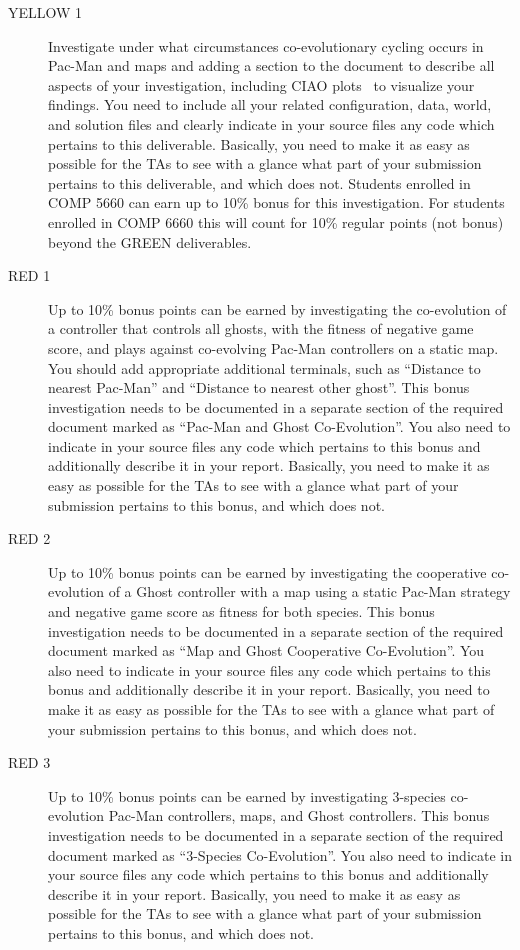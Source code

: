 \documentclass{article}
\begin{document}
\begin{description}
\item[YELLOW 1] Investigate under what circumstances co-evolutionary cycling occurs in Pac-Man and maps and adding a section to the document to describe all aspects of your investigation, including CIAO plots~\cite{Cliff1995} to visualize your findings. You need to include all your related configuration, data, world, and solution files and clearly indicate in your source files any code which pertains to this deliverable. Basically, you need to make it as easy as possible for the TAs to see with a glance what part of your submission pertains to this deliverable, and which does not.
Students enrolled in COMP 5660 can earn up to 10\% bonus for this investigation. For students enrolled in COMP 6660 this will count for 10\% regular points (not bonus) beyond the GREEN deliverables. 

\item[RED 1] Up to 10\% bonus points can be earned by investigating the co-evolution of a controller that controls all ghosts, with the fitness of negative game score, and plays against co-evolving Pac-Man controllers on a static map. You should add appropriate additional terminals, such as ``Distance to nearest Pac-Man'' and ``Distance to nearest other ghost''. This bonus investigation needs to be documented in a separate section of the required document marked as ``Pac-Man and Ghost Co-Evolution''. You also need to indicate in your source files any code which pertains to this bonus and additionally describe it in your report. Basically, you need to make it as easy as possible for the TAs to see with a glance what part of your submission pertains to this bonus, and which does not.

\item[RED 2] Up to 10\% bonus points can be earned by investigating the cooperative co-evolution of a Ghost controller with a map using a static Pac-Man strategy and negative game score as fitness for both species. This bonus investigation needs to be documented in a separate section of the required document marked as ``Map and Ghost Cooperative Co-Evolution''. You also need to indicate in your source files any code which pertains to this bonus and additionally describe it in your report. Basically, you need to make it as easy as possible for the TAs to see with a glance what part of your submission pertains to this bonus, and which does not.

\item[RED 3] Up to 10\% bonus points can be earned by investigating 3-species co-evolution Pac-Man controllers, maps, and Ghost controllers. This bonus investigation needs to be documented in a separate section of the required document marked as ``3-Species Co-Evolution''. You also need to indicate in your source files any code which pertains to this bonus and additionally describe it in your report. Basically, you need to make it as easy as possible for the TAs to see with a glance what part of your submission pertains to this bonus, and which does not.


\end{description}
\end{document}
